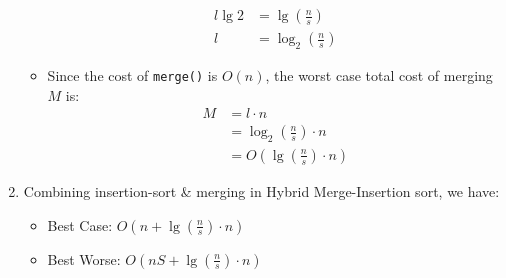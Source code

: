 \begin{enumerate}
\begin{itemize}
\begin{equation}
\begin{split}
          l\lg{2} &= \lg{(\frac{n}{s})} \\
          l &= \log_2{(\frac{n}{s})}
        \end{split}
      \end{equation}
    \item Since the cost of \texttt{merge()} is $O(n)$, the worst case total cost of merging $M$ is:
      \begin{equation}
        \begin{split}
          M &= l \cdot n \\
            &= \log_2{(\frac{n}{s})} \cdot n \\
            &= O(\lg{(\frac{n}{s})} \cdot n)
        \end{split}
      \end{equation}
  \end{itemize}
  \item Combining insertion-sort \& merging in Hybrid Merge-Insertion sort, we have:
    \begin{itemize}
      \item Best Case: $O(n + \lg{(\frac{n}{s})} \cdot n)$
      \item Best Worse: $O(nS + \lg{(\frac{n}{s})} \cdot n)$
    \end{itemize}
\end{enumerate}

